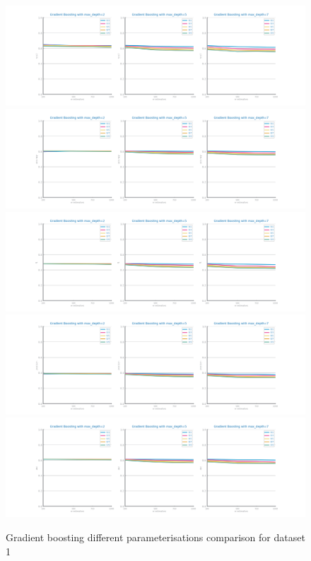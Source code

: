 \documentclass[10pt]{extarticle}
\begin{document}
\begin{figure}[H]
\centering\includegraphics[scale=0.60]{images/dataset1/models_evaluation/CovidPos_gb_recall_study.png}
\includegraphics[scale=0.60]{images/dataset1/models_evaluation/CovidPos_gb_accuracy_study.png}
\includegraphics[scale=0.60]{images/dataset1/models_evaluation/CovidPos_gb_f1_study.png}
\includegraphics[scale=0.60]{images/dataset1/models_evaluation/CovidPos_gb_precision_study.png}
\includegraphics[scale=0.60]{images/dataset1/models_evaluation/CovidPos_gb_auc_study.png}
\caption{Gradient boosting different parameterisations comparison for dataset 1}
\end{figure}
\end{document}
